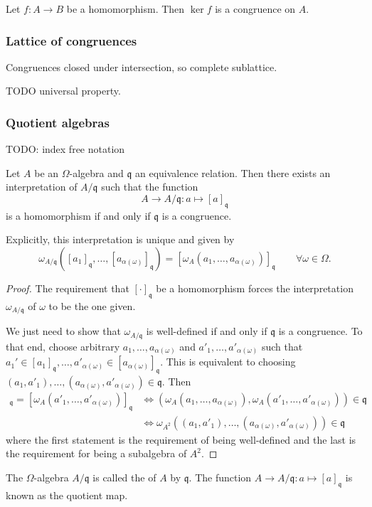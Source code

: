\begin{proposition} \label{kernelCongruence}
Let $f:A\to B$ be a homomorphism. Then $\ker f$ is a congruence on $A$.
\end{proposition}

\subsubsection{Lattice of congruences}

Congruences closed under intersection, so complete sublattice.

TODO universal property.

\subsubsection{Quotient algebras}
TODO: index free notation

\begin{proposition} \label{quotientAlgebra}
Let $A$ be an $\Omega$-algebra and $\mathfrak{q}$ an equivalence relation. Then there exists an interpretation of $A/\mathfrak{q}$ such that the function
\[ A \to A/\mathfrak{q}: a\mapsto [a]_\mathfrak{q} \]
is a homomorphism if and only if $\mathfrak{q}$ is a congruence.

Explicitly, this interpretation is unique and given by
\[ \omega_{A/\mathfrak{q}}([a_1]_{\mathfrak{q}},\ldots,[a_{\alpha(\omega)}]_{\mathfrak{q}}) = [\omega_A(a_1,\ldots, a_{\alpha(\omega)})]_{\mathfrak{q}} \qquad \forall \omega\in\Omega. \]\end{proposition}
\begin{proof}
The requirement that $[\cdot]_\mathfrak{q}$ be a homomorphism forces the interpretation $\omega_{A/\mathfrak{q}}$ of $\omega$ to be the one given.

We just need to show that $\omega_{A/\mathfrak{q}}$ is well-defined if and only if $\mathfrak{q}$ is a congruence. To that end, choose arbitrary $a_1, \ldots, a_{\alpha(\omega)}$ and $a'_1, \ldots, a'_{\alpha(\omega)}$ such that $a_1'\in[a_1]_\mathfrak{q}, \ldots, a'_{\alpha(\omega)}\in [a_{\alpha(\omega)}]_\mathfrak{q}$. This is equivalent to choosing $(a_1,a'_1),\ldots, (a_{\alpha(\omega)},a'_{\alpha(\omega)}) \in \mathfrak{q}$. Then
\begin{align*}
[\omega_A(a_1,\ldots, a_{\alpha(\omega)})]_{\mathfrak{q}} = [\omega_A(a'_1,\ldots, a'_{\alpha(\omega)})]_{\mathfrak{q}} &\iff (\omega_A(a_1,\ldots, a_{\alpha(\omega)}),\omega_A(a'_1,\ldots, a'_{\alpha(\omega)})) \in \mathfrak{q} \\
&\iff \omega_{A^2}((a_1,a'_1),\ldots, (a_{\alpha(\omega)},a'_{\alpha(\omega)})) \in \mathfrak{q}
\end{align*}
where the first statement is the requirement of being well-defined and the last is the requirement for being a subalgebra of $A^2$.
\end{proof}
\begin{definition}
The $\Omega$-algebra $A/\mathfrak{q}$ is called the  of $A$ by $\mathfrak{q}$. The function $A \to A/\mathfrak{q}: a\mapsto [a]_\mathfrak{q}$ is known as the quotient map.
\end{definition}

